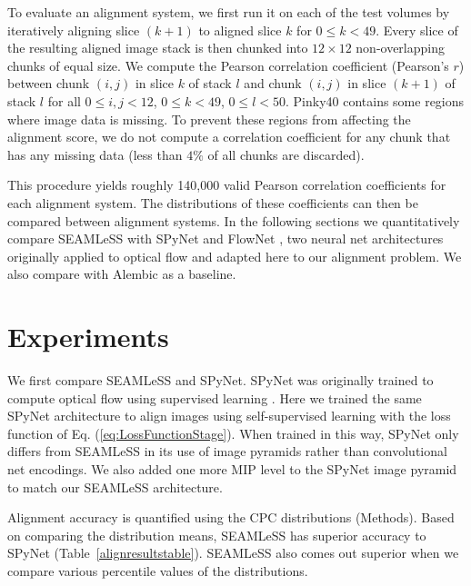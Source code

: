 \documentclass{article}
\begin{document}
To evaluate an alignment system, we first run it on each of the test volumes by iteratively aligning slice $(k+1)$ to aligned slice $k$ for $0 \le k < 49$. Every slice of the resulting aligned image stack is then chunked into $12\times 12$ non-overlapping chunks of equal size. We compute the Pearson correlation coefficient (Pearson's $r$) between chunk $(i,j)$ in slice $k$ of stack $l$  and chunk $(i,j)$ in slice $(k+1)$ of stack $l$ for all $0\le  i,j<12$, $0 \le k < 49$, $0\le l < 50$. Pinky40 contains some regions where image data is missing. To prevent these regions from affecting the alignment score, we do not compute a correlation coefficient for any chunk that has any missing data (less than $4\%$ of all chunks are discarded).

This procedure yields roughly 140,000 valid Pearson correlation coefficients for each alignment system. The  distributions of these coefficients can then be compared between alignment systems. In the following sections we quantitatively compare SEAMLeSS with SPyNet \citep{ranjan2017optical} and FlowNet \citep{flownet}, two neural net architectures originally applied to optical flow and adapted here to our alignment problem. We also compare with Alembic as a baseline.



\section{Experiments}

We first compare SEAMLeSS and SPyNet. SPyNet was originally trained to compute optical flow using supervised learning \citep{ranjan2017optical}. Here we trained the same SPyNet architecture to align images using self-supervised learning with the loss function of Eq. (\ref{eq:LossFunctionStage}). When trained in this way, SPyNet only differs from SEAMLeSS in its use of image pyramids rather than convolutional net encodings. We also added one more MIP level to the SPyNet image pyramid to match our SEAMLeSS architecture. 

Alignment accuracy is quantified using the CPC distributions (Methods). 
Based on comparing the distribution means, SEAMLeSS has superior accuracy to SPyNet (Table~\ref{alignresultstable}). SEAMLeSS also comes out superior when we compare various percentile values of the distributions.
\end{document}
